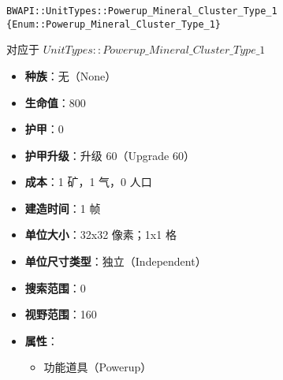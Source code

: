 \begin{tcolorbox}[colback=white, colframe=black!60!white, title=Powerup\_Mineral\_Cluster\_Type\_1(), arc=0mm]
    \begin{verbatim}
BWAPI::UnitTypes::Powerup_Mineral_Cluster_Type_1 {Enum::Powerup_Mineral_Cluster_Type_1}
    \end{verbatim}
    对应于  $UnitTypes::Powerup\_Mineral\_Cluster\_Type\_1$ 
    \begin{itemize}
        \item \textbf{种族}：无（None）
        \item \textbf{生命值}：800
        \item \textbf{护甲}：0
        \item \textbf{护甲升级}：升级 60（Upgrade 60）
        \item \textbf{成本}：1 矿，1 气，0 人口
        \item \textbf{建造时间}：1 帧
        \item \textbf{单位大小}：32x32 像素；1x1 格
        \item \textbf{单位尺寸类型}：独立（Independent）
        \item \textbf{搜索范围}：0
        \item \textbf{视野范围}：160
        \item \textbf{属性}：
            \begin{itemize}
                \item 功能道具（Powerup）
            \end{itemize}
    \end{itemize}
\end{tcolorbox}

